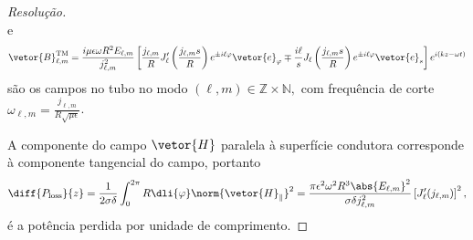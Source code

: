 \begin{proof}[Resolução]
\begin{equation*}
    \end{equation*}
    e
    \begin{equation*}
        \vetor{B}^\mathrm{TM}_{\ell, m} = \frac{i \mu \epsilon \omega R^2 E_{\ell, m}}{j_{\ell,m}^2}\left[\frac{j_{\ell, m}}{R} J_\ell'\left(\frac{j_{\ell,m} s}{R}\right)e^{\pm i \ell \varphi} \vetor{e}_\varphi \mp \frac{i \ell}{s} J_\ell\left(\frac{j_{\ell,m} s}{R}\right)e^{\pm i \ell \varphi}\vetor{e}_s\right] e^{i(kz - \omega t)}
    \end{equation*}
    são os campos no tubo no modo \((\ell, m) \in \mathbb{Z} \times \mathbb{N},\) com frequência de corte \(\omega_{\ell,m} = \frac{j_{\ell,m}}{R\sqrt{\mu \epsilon}}\).

    A componente do campo \(\vetor{H}\) paralela à superfície condutora corresponde à componente tangencial do campo, portanto 
    \begin{equation*}
        \diff{P_\mathrm{loss}}{z} = \frac{1}{2 \sigma \delta} \int_0^{2\pi} R \dli{\varphi} \norm{\vetor{H}_\parallel}^2 = \frac{\pi \epsilon^2 \omega^2 R^3 \abs{E_{\ell,m}}^2}{\sigma \delta j_{\ell, m}^2} \left[J_\ell'(j_{\ell,m})\right]^2,
    \end{equation*}
    é a potência perdida por unidade de comprimento.
\end{proof}
